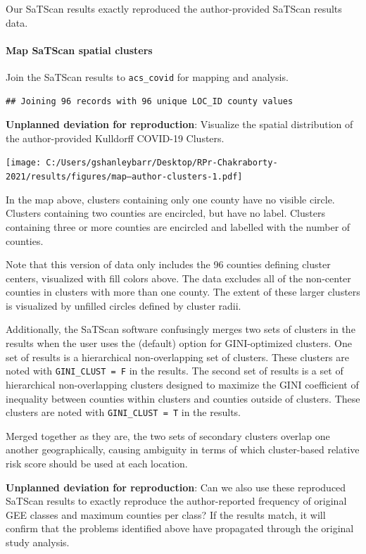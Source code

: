 \documentclass[
]{article}
\begin{document}
Our SaTScan results exactly reproduced the author-provided SaTScan
results data.

\hypertarget{map-satscan-spatial-clusters}{%
\paragraph{Map SaTScan spatial
clusters}\label{map-satscan-spatial-clusters}}

Join the SaTScan results to \texttt{acs\_covid} for mapping and
analysis.

\begin{verbatim}
## Joining 96 records with 96 unique LOC_ID county values
\end{verbatim}

\textbf{Unplanned deviation for reproduction}: Visualize the spatial
distribution of the author-provided Kulldorff COVID-19 Clusters.

\texttt{[image: C:/Users/gshanleybarr/Desktop/RPr-Chakraborty-2021/results/figures/map--author-clusters-1.pdf]}

In the map above, clusters containing only one county have no visible
circle. Clusters containing two counties are encircled, but have no
label. Clusters containing three or more counties are encircled and
labelled with the number of counties.

Note that this version of data only includes the 96 counties defining
cluster centers, visualized with fill colors above. The data excludes
all of the non-center counties in clusters with more than one county.
The extent of these larger clusters is visualized by unfilled circles
defined by cluster radii.

Additionally, the SaTScan software confusingly merges two sets of
clusters in the results when the user uses the (default) option for
GINI-optimized clusters. One set of results is a hierarchical
non-overlapping set of clusters. These clusters are noted with
\texttt{GINI\_CLUST\ =\ F} in the results. The second set of results is
a set of hierarchical non-overlapping clusters designed to maximize the
GINI coefficient of inequality between counties within clusters and
counties outside of clusters. These clusters are noted with
\texttt{GINI\_CLUST\ =\ T} in the results.

Merged together as they are, the two sets of secondary clusters overlap
one another geographically, causing ambiguity in terms of which
cluster-based relative risk score should be used at each location.

\textbf{Unplanned deviation for reproduction}: Can we also use these
reproduced SaTScan results to exactly reproduce the author-reported
frequency of original GEE classes and maximum counties per class? If the
results match, it will confirm that the problems identified above have
propagated through the original study analysis.
\end{document}
